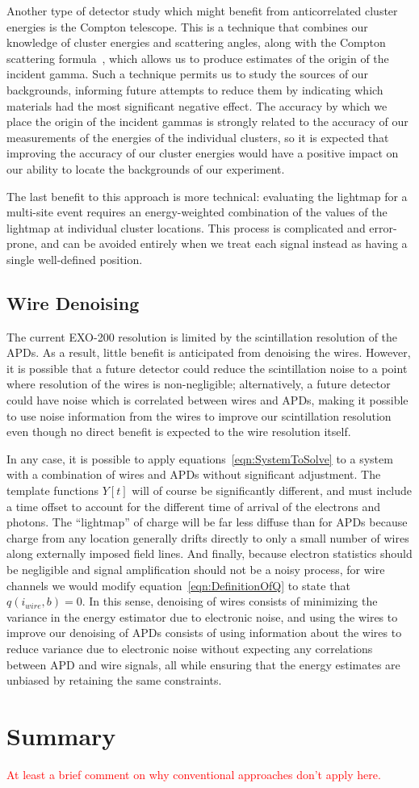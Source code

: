 Another type of detector study which might benefit from anticorrelated cluster energies is the Compton telescope.  This is a technique that combines our knowledge of cluster energies and scattering angles, along with the Compton scattering formula~\cite{ComptonScattering}, which allows us to produce estimates of the origin of the incident gamma.  Such a technique permits us to study the sources of our backgrounds, informing future attempts to reduce them by indicating which materials had the most significant negative effect.  The accuracy by which we place the origin of the incident gammas is strongly related to the accuracy of our measurements of the energies of the individual clusters, so it is expected that improving the accuracy of our cluster energies would have a positive impact on our ability to locate the backgrounds of our experiment.

The last benefit to this approach is more technical: evaluating the lightmap for a multi-site event requires an energy-weighted combination of the values of the lightmap at individual cluster locations.  This process is complicated and error-prone, and can be avoided entirely when we treat each signal instead as having a single well-defined position.

\subsection{Wire Denoising}

The current EXO-200 resolution is limited by the scintillation resolution of the APDs.  As a result, little benefit is anticipated from denoising the wires.  However, it is possible that a future detector could reduce the scintillation noise to a point where resolution of the wires is non-negligible; alternatively, a future detector could have noise which is correlated between wires and APDs, making it possible to use noise information from the wires to improve our scintillation resolution even though no direct benefit is expected to the wire resolution itself.

In any case, it is possible to apply equations~\ref{eqn:SystemToSolve} to a system with a combination of wires and APDs without significant adjustment.  The template functions $Y[t]$ will of course be significantly different, and must include a time offset to account for the different time of arrival of the electrons and photons.  The ``lightmap'' of charge will be far less diffuse than for APDs because charge from any location generally drifts directly to only a small number of wires along externally imposed field lines.  And finally, because electron statistics should be negligible and signal amplification should not be a noisy process, for wire channels we would modify equation~\ref{eqn:DefinitionOfQ} to state that $q(i_{wire}, b) = 0$.  In this sense, denoising of wires consists of minimizing the variance in the energy estimator due to electronic noise, and using the wires to improve our denoising of APDs consists of using information about the wires to reduce variance due to electronic noise without expecting any correlations between APD and wire signals, all while ensuring that the energy estimates are unbiased by retaining the same constraints.

\section{Summary}

\textcolor{red}{At least a brief comment on why conventional approaches don't apply here.}
